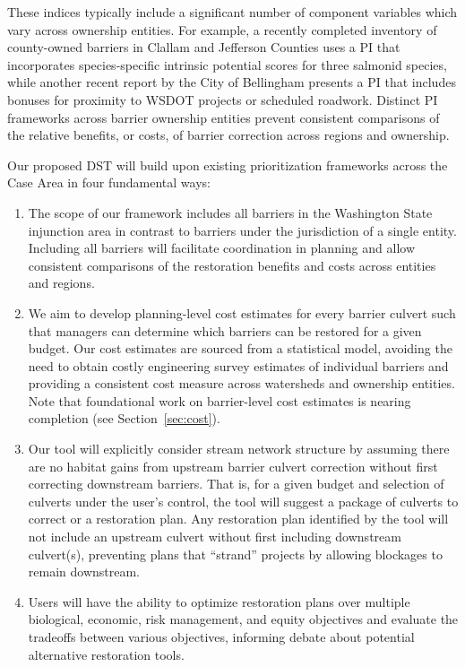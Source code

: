 \documentclass[12pt]{elsarticle}
\begin{document}
These indices typically include a significant number of component variables which vary across ownership entities. For example, a recently completed inventory of county-owned barriers in Clallam and Jefferson Counties uses a PI that incorporates species-specific intrinsic potential scores for three salmonid species, while another recent report by the City of Bellingham presents a PI that includes bonuses for proximity to WSDOT projects or scheduled roadwork. Distinct PI frameworks across barrier ownership entities prevent consistent comparisons of the relative benefits, or costs, of barrier correction across regions and ownership. 

Our proposed DST will build upon existing prioritization frameworks across the Case Area in four fundamental ways: 

\begin{enumerate}
\item The scope of our framework includes all barriers in the Washington State injunction area in contrast to barriers under the jurisdiction of a single entity. Including all barriers will facilitate coordination in planning and allow consistent comparisons of the restoration benefits and costs across entities and regions. 
\item We aim to develop planning-level cost estimates for every barrier culvert such that managers can determine which barriers can be restored for a given budget. Our cost estimates are sourced from a statistical model, avoiding the need to obtain costly engineering survey estimates of individual barriers and providing a consistent cost measure across watersheds and ownership entities. Note that foundational work on barrier-level cost estimates is nearing completion (see Section~\ref{sec:cost}).
\item Our tool will explicitly consider stream network structure by assuming there are no habitat gains from upstream barrier culvert correction without first correcting downstream barriers. That is, for a given budget and selection of culverts under the user's control, the tool will suggest a package of culverts to correct or a restoration plan. Any restoration plan identified by the tool will not include an upstream culvert without first including downstream culvert(s), preventing plans that ``strand'' projects by allowing blockages to remain downstream. 
\item Users will have the ability to optimize restoration plans over multiple biological, economic, risk management, and equity objectives and evaluate the tradeoffs between various objectives, informing debate about potential alternative restoration tools. 
\end{enumerate}
\end{document}
